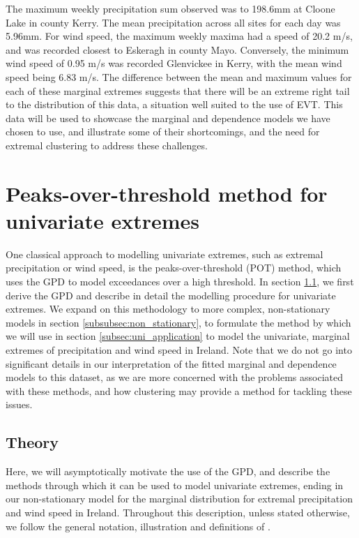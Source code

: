 \documentclass{article}
\numberwithin{equation}{section}
\begin{document}
The maximum weekly precipitation sum observed was to 198.6mm at Cloone Lake in county Kerry. 
The mean precipitation across all sites for each day was 5.96mm.
For wind speed, the maximum weekly maxima had a speed of 20.2 m/s, and was recorded closest to Eskeragh in county Mayo.
Conversely, the minimum wind speed of 0.95 m/s was recorded Glenvickee in Kerry, with the mean wind speed being 6.83 m/s.
The difference between the mean and maximum values for each of these marginal extremes suggests that there will be an extreme right tail to the distribution of this data, a situation well suited to the use of EVT.
This data will be used to showcase the marginal and dependence models we have chosen to use, and illustrate some of their shortcomings, and the need for extremal clustering to address these challenges.

\newpage
\section{Peaks-over-threshold method for univariate extremes}\label{sec:uni}

One classical approach to modelling univariate extremes, such as extremal precipitation or wind speed, is the peaks-over-threshold (POT) method, which uses the GPD to model exceedances over a high threshold.
In section \ref{subsec:uni_theory}, we first derive the GPD and describe in detail the modelling procedure for univariate extremes.
We expand on this methodology to more complex, non-stationary models in section \ref{subsubsec:non_stationary}, to formulate the method by which we will use in section \ref{subsec:uni_application} to model the univariate, marginal extremes of precipitation and wind speed in Ireland.
Note that we do not go into significant details in our interpretation of the fitted marginal and dependence models to this dataset, as we are more concerned with the problems associated with these methods, and how clustering may provide a method for tackling these issues.

\subsection{Theory} \label{subsec:uni_theory}

Here, we will asymptotically motivate the use of the GPD, and describe the methods through which it can be used to model univariate extremes, ending in our non-stationary model for the marginal distribution for extremal precipitation and wind speed in Ireland.
Throughout this description, unless stated otherwise, we follow the general notation, illustration and definitions of \citep{Coles2001}.
\end{document}
